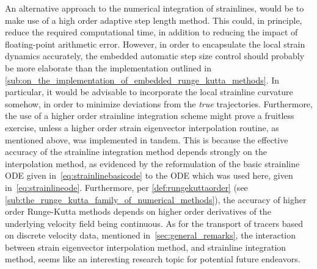 An alternative approach to the numerical integration of strainlines, would be
to make use of a high order adaptive step length method. This could, in
principle, reduce the required computational time, in addition to reducing
the impact of floating-point arithmetic error. However, in order to encapsulate
the local strain dynamics accurately, the embedded automatic step size control
should probably be more elaborate than the implementation outlined in
\cref{sub:on_the_implementation_of_embedded_runge_kutta_methods}. In particular,
it would be advisable to incorporate the local strainline curvature somehow,
in order to minimize deviations from the \emph{true} trajectories. Furthermore,
the use of a higher order strainline integration scheme might prove a fruitless
exercise, unless a higher order strain eigenvector interpolation routine, as
mentioned above, was implemented in tandem. This is because the effective
accuracy of the strainline integration method depends strongly on the
interpolation method, as evidenced by the reformulation of the basic
strainline ODE given in~\cref{eq:strainlinebasicode} to the ODE which
was used here, given in~\cref{eq:strainlineode}. Furthermore, per
\cref{def:rungekuttaorder} (see
\cref{sub:the_runge_kutta_family_of_numerical_methods}), the accuracy of
higher order Runge-Kutta methods depends on higher order derivatives of the
underlying velocity field being continuous. As for the transport of tracers
based on discrete velocity data, mentioned in~\cref{sec:general_remarks}, the
interaction between strain eigenvector interpolation method, and strainline
integration method, seems like an interesting research topic for potential
future endeavors.

%

